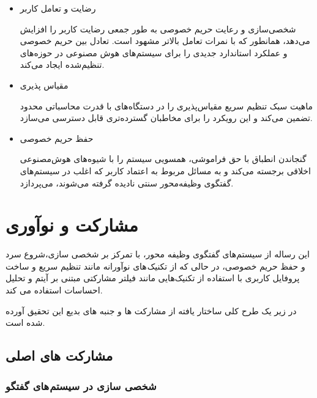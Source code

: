 \begin{itemize}
\item
رضایت و تعامل کاربر

 شخصی‌سازی و رعایت حریم خصوصی به طور جمعی رضایت کاربر را افزایش می‌دهد، همانطور که با نمرات تعامل بالاتر مشهود است.
 تعادل بین حریم خصوصی و عملکرد استاندارد جدیدی را برای سیستم‌های هوش مصنوعی در حوزه‌های تنظیم‌شده ایجاد می‌کند.
\item
مقیاس پذیری

ماهیت سبک تنظیم سریع مقیاس‌پذیری را در دستگاه‌های با قدرت محاسباتی محدود تضمین می‌کند و این رویکرد را برای مخاطبان گسترده‌تری قابل دسترسی می‌سازد.
\item
حفظ حریم خصوصی

گنجاندن انطباق با حق فراموشی، همسویی سیستم را با شیوه‌های هوش‌مصنوعی اخلاقی برجسته می‌کند و به مسائل مربوط به اعتماد کاربر که اغلب در سیستم‌های گفتگوی وظیفه‌محور سنتی نادیده گرفته می‌شوند، می‌پردازد.
\end{itemize}

\section{مشارکت و نوآوری}
این رساله از سیستم‌های گفتگوی وظیفه محور، با تمرکز بر شخصی سازی،شروع سرد و حفظ حریم خصوصی، در حالی که از تکنیک های نوآورانه مانند تنظیم سریع و ساخت پروفایل کاربری با استفاده از تکنیک‌هایی مانند فیلتر مشارکتی مبتنی بر آیتم و تحلیل احساسات استفاده می کند.

در زیر یک طرح کلی ساختار یافته از مشارکت ها و جنبه های بدیع این تحقیق آورده شده است.

\subsection{مشارکت های اصلی}
\subsubsection{شخصی سازی در سیستم های گفتگو}


